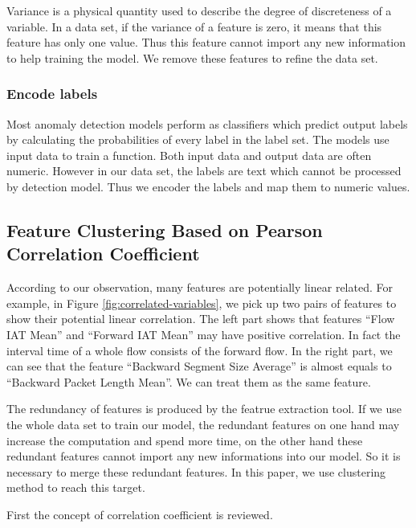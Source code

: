 \documentclass{ieeeaccess}
\theoremstyle{definition}
\begin{document}
Variance is a physical quantity used to describe the degree of discreteness of a variable. In a data set, if the variance of a feature is zero, it means that this feature has only one value. Thus this feature cannot import any new information to help training the model. We remove these features to refine the data set.

\subsubsection{Encode labels}

Most anomaly detection models perform as classifiers which predict output labels by calculating the probabilities of every label in the label set. The models use input data to train a function. Both input data and output data are often numeric. However in our data set, the labels are text which cannot be processed by detection model. Thus we encoder the labels and map them to numeric values.

\subsection{Feature Clustering Based on Pearson Correlation Coefficient}

According to our observation, many features are potentially linear related. For example, in Figure \ref{fig:correlated-variables}, we pick up two pairs of features to show their potential linear correlation. The left part shows that features ``Flow IAT Mean'' and ``Forward IAT Mean'' may have positive correlation. In fact the interval time of a whole flow consists of the forward flow. In the right part, we can see that the feature ``Backward Segment Size Average'' is almost equals to ``Backward Packet Length Mean''. We can treat them as the same feature.

The redundancy of features is produced by the featrue extraction tool. If we use the whole data set to train our model, the redundant features on one hand may increase the computation and spend more time, on the other hand these redundant features cannot import any new informations into our model. So it is necessary to merge these redundant features. In this paper, we use clustering method to reach this target.

First the concept of correlation coefficient is reviewed.
\end{document}
